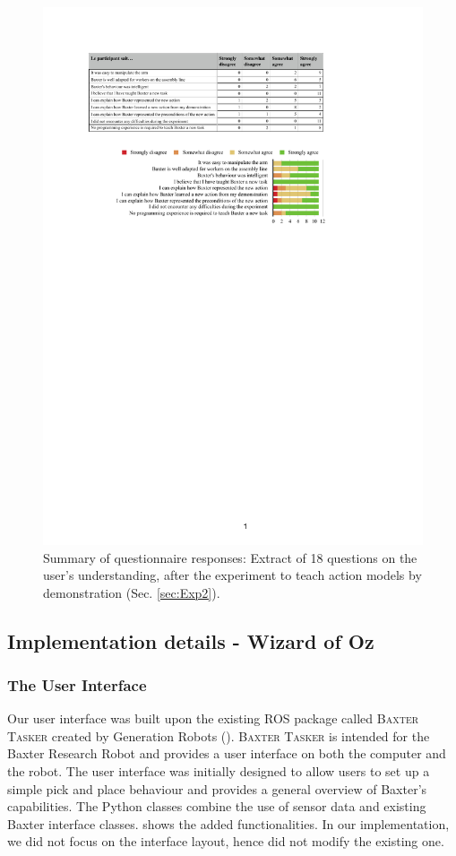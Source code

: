  \begin{figure}[ht]
  \centering
  \includegraphics[width=\linewidth]{figures/eEvaluation}
  \caption{Summary of questionnaire responses: Extract of 18 questions on the user's understanding, after the experiment to teach action models by demonstration (Sec. \ref{sec:Exp2}).}
  \label{fig:eEvaluation}
\end{figure}


\subsection{Implementation details - Wizard of Oz}
\subsubsection{The User Interface}
Our user interface was built upon the existing ROS package called \textsc{Baxter Tasker} created by Generation Robots (\cite{BaxterTasker}).
\textsc{Baxter Tasker} is intended for the Baxter Research Robot and provides a user interface on both the computer and the robot.
The user interface was initially designed to allow users to set up a simple pick and place behaviour and provides a general overview of Baxter's capabilities.
The Python classes combine the use of sensor data and existing Baxter interface classes.
 shows the added functionalities.
In our implementation, we did not focus on the interface layout, hence did not modify the existing one.

